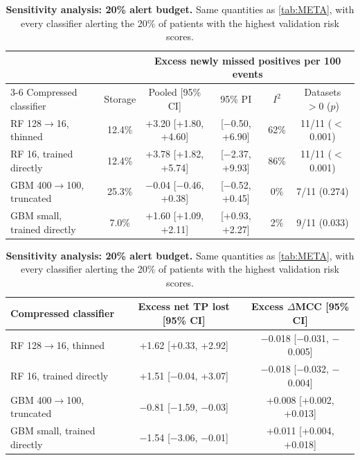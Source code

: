 \begin{table}[!htb]
\centering
\caption{\textbf{Sensitivity analysis: 20\% alert budget.} Same quantities as \autoref{tab:META}, with every classifier alerting the 20\% of patients with the highest validation risk scores.}
\label{tab:META-20}
{\small
\begin{tabular}{lccccc}
\toprule
 & & \multicolumn{4}{c}{Excess newly missed positives per 100 events} \\
\cmidrule(l){3-6}
Compressed classifier & Storage & Pooled [95\% CI] & 95\% PI & $I^2$ & Datasets $>0$ ($p$) \\
\midrule
RF 128$\rightarrow$16, thinned & 12.4\% & +3.20 [+1.80, +4.60] & [$-$0.50, +6.90] & 62\% & 11/11 ($<$0.001) \\
RF 16, trained directly & 12.4\% & +3.78 [+1.82, +5.74] & [$-$2.37, +9.93] & 86\% & 11/11 ($<$0.001) \\
GBM 400$\rightarrow$100, truncated & 25.3\% & $-$0.04 [$-$0.46, +0.38] & [$-$0.52, +0.45] & 0\% & 7/11 (0.274) \\
GBM small, trained directly & 7.0\% & +1.60 [+1.09, +2.11] & [+0.93, +2.27] & 2\% & 9/11 (0.033) \\
\bottomrule
\end{tabular}
\par\vspace{1.2em}
\begin{tabular}{lcc}
\toprule
Compressed classifier & Excess net TP lost [95\% CI] & Excess $\Delta$MCC [95\% CI] \\
\midrule
RF 128$\rightarrow$16, thinned & +1.62 [+0.33, +2.92] & $-$0.018 [$-$0.031, $-$0.005] \\
RF 16, trained directly & +1.51 [$-$0.04, +3.07] & $-$0.018 [$-$0.032, $-$0.004] \\
GBM 400$\rightarrow$100, truncated & $-$0.81 [$-$1.59, $-$0.03] & +0.008 [+0.002, +0.013] \\
GBM small, trained directly & $-$1.54 [$-$3.06, $-$0.01] & +0.011 [+0.004, +0.018] \\
\bottomrule
\end{tabular}
}
\end{table}
